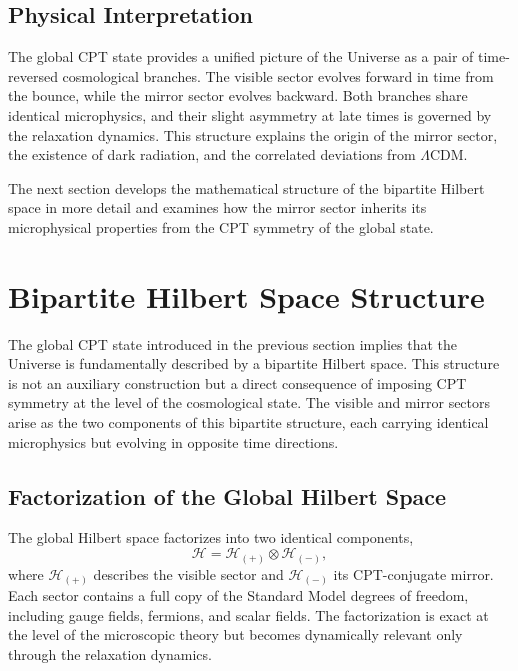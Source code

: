 \documentclass[11pt,a4paper]{article}
\begin{document}
\subsection{Physical Interpretation}

The global CPT state provides a unified picture of the Universe as a pair of time-reversed cosmological branches. The visible sector evolves forward in time from the bounce, while the mirror sector evolves backward. Both branches share identical microphysics, and their slight asymmetry at late times is governed by the relaxation dynamics. This structure explains the origin of the mirror sector, the existence of dark radiation, and the correlated deviations from $\Lambda$CDM.

The next section develops the mathematical structure of the bipartite Hilbert space in more detail and examines how the mirror sector inherits its microphysical properties from the CPT symmetry of the global state.


\section{Bipartite Hilbert Space Structure}

The global CPT state introduced in the previous section implies that the Universe is fundamentally described by a bipartite Hilbert space. This structure is not an auxiliary construction but a direct consequence of imposing CPT symmetry at the level of the cosmological state. The visible and mirror sectors arise as the two components of this bipartite structure, each carrying identical microphysics but evolving in opposite time directions.

\subsection{Factorization of the Global Hilbert Space}

The global Hilbert space factorizes into two identical components,
\begin{equation}
    \mathcal{H} = \mathcal{H}_{(+)} \otimes \mathcal{H}_{(-)},
\end{equation}
where $\mathcal{H}_{(+)}$ describes the visible sector and $\mathcal{H}_{(-)}$ its CPT-conjugate mirror. Each sector contains a full copy of the Standard Model degrees of freedom, including gauge fields, fermions, and scalar fields. The factorization is exact at the level of the microscopic theory but becomes dynamically relevant only through the relaxation dynamics.
\end{document}
